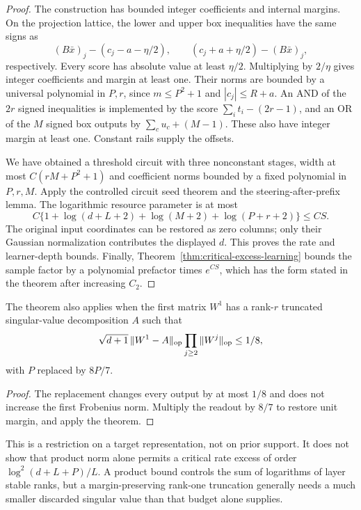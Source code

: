 \begin{proof}
The construction has bounded integer coefficients and internal
margins. On the projection lattice, the lower and upper box
inequalities have the same signs as
\[
 (B\bar x)_j-(c_j-a-\eta/2),\qquad
 (c_j+a+\eta/2)-(B\bar x)_j,
\]
respectively. Every score has absolute value at least $\eta/2$.
Multiplying by $2/\eta$ gives integer coefficients and margin at
least one. Their norms are bounded by a universal polynomial in
$P,r$, since $m\le P^2+1$ and $|c_j|\le R+a$.
An AND of the $2r$ signed inequalities is implemented by the score
$\sum_i t_i-(2r-1)$, and an OR of the $M$ signed box outputs by
$\sum_c u_c+(M-1)$. These also have integer margin at least one.
Constant rails supply the offsets.

We have obtained a threshold circuit with three nonconstant stages,
width at most $C(rM+P^2+1)$ and coefficient norms bounded by a fixed
polynomial in $P,r,M$. Apply the controlled circuit seed theorem
and the steering-after-prefix lemma. The logarithmic resource
parameter is at most
\[
 C\{1+\log(d+L+2)+\log(M+2)+\log(P+r+2)\}\le CS.
\]
The original input coordinates can be restored as zero columns;
only their Gaussian normalization contributes the displayed $d$.
This proves the rate and learner-depth bounds. Finally,
Theorem~\ref{thm:critical-excess-learning} bounds the sample factor
by a polynomial prefactor times $e^{CS}$, which has the form stated
in the theorem after increasing $C_2$.
\end{proof}

\begin{corollary}
\label{cor:critical-approx-low-rank-targets}
The theorem also applies when the first matrix $W^1$ has a rank-$r$
truncated singular-value decomposition $A$ such that
\[
 \sqrt{d+1}\,\|W^1-A\|_{\rm op}
              \prod_{j\ge2}\|W^j\|_{\rm op}\le1/8,
\]
with $P$ replaced by $8P/7$.
\end{corollary}

\begin{proof}
The replacement changes every output by at most $1/8$ and does not
increase the first Frobenius norm. Multiply the readout by $8/7$
to restore unit margin, and apply the theorem.
\end{proof}

This is a restriction on a target representation, not on prior
support. It does not show that product norm alone permits a critical
rate excess of order $\log^2(d+L+P)/L$. A product bound controls the
sum of logarithms of layer stable ranks, but a margin-preserving
rank-one truncation generally needs a much smaller discarded
singular value than that budget alone supplies.
